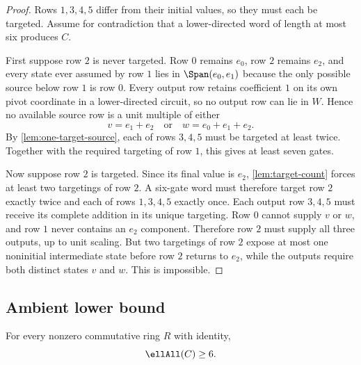 \begin{proof}
Rows $1,3,4,5$ differ from their initial values, so they must each be targeted.  Assume for contradiction that a lower-directed word of length at most six produces $C$.

First suppose row $2$ is never targeted.  Row $0$ remains $e_0$, row $2$ remains $e_2$, and every state ever assumed by row $1$ lies in $\Span(e_0,e_1)$ because the only possible source below row $1$ is row $0$.  Every output row retains coefficient $1$ on its own pivot coordinate in a lower-directed circuit, so no output row can lie in $W$.  Hence no available source row is a unit multiple of either
\[
v=e_1+e_2
\quad\text{or}\quad
w=e_0+e_1+e_2.
\]
By \cref{lem:one-target-source}, each of rows $3,4,5$ must be targeted at least twice.  Together with the required targeting of row $1$, this gives at least seven gates.

Now suppose row $2$ is targeted.  Since its final value is $e_2$, \cref{lem:target-count} forces at least two targetings of row $2$.  A six-gate word must therefore target row $2$ exactly twice and each of rows $1,3,4,5$ exactly once.  Each output row $3,4,5$ must receive its complete addition in its unique targeting.  Row $0$ cannot supply $v$ or $w$, and row $1$ never contains an $e_2$ component.  Therefore row $2$ must supply all three outputs, up to unit scaling.  But two targetings of row $2$ expose at most one noninitial intermediate state before row $2$ returns to $e_2$, while the outputs require both distinct states $v$ and $w$.  This is impossible.
\end{proof}

\subsection{Ambient lower bound}

\begin{proposition}\label{prop:ambient-lower-bound}
For every nonzero commutative ring $R$ with identity,
\[
\ellAll(C)\ge6.
\]
\end{proposition}

